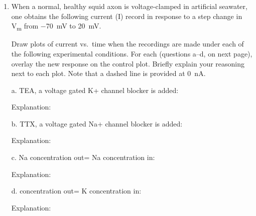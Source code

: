 \documentclass[plain]{inVerba-notes}
\begin{document}
\begin{enumerate}[resume]
    \item When a normal, healthy squid axon is voltage-clamped in artificial seawater, one obtains the following current (I) record in response to a step change in \si{V_m} from \SI{-70}{mV} to \SI{+20}{mV}.
    
    \bigskip
    \bigskip
    
    

    Draw plots of current vs.\ time when the recordings are made under each of the following experimental conditions. For each (questions a--d, on next page), overlay the new response on the control plot. Briefly explain your reasoning next to each plot. Note that a dashed line is provided at \SI{0}{nA}. 
    
    \newpage
    \item[a.] TEA, a voltage gated K+ channel blocker is added:
    
    \bigskip
    \bigskip
    

    Explanation:
    \vspace{80pt}

    \item[b.] TTX, a voltage gated Na+ channel blocker is added:
    
    \bigskip
    \bigskip
    
    
    Explanation:
    \vspace{80pt}

    \newpage
    \item[c.] Na concentration out= Na concentration in:
    
    \bigskip
    \bigskip
    
    
    Explanation:
    \vspace{80pt}

    \item[d.]  concentration out= K concentration in:

    \bigskip
    \bigskip
    
    
    Explanation:
    \vspace{80pt}
\end{enumerate}
\end{document}
